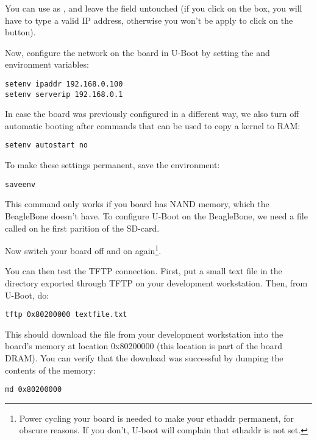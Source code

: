You can use  as , and leave the
 field untouched (if you click on the  box, you
will have to type a valid IP address, otherwise you won't be apply to
click on the  button).

Now, configure the network on the board in U-Boot by setting the 
and  environment variables:

\begin{verbatim}
setenv ipaddr 192.168.0.100
setenv serverip 192.168.0.1
\end{verbatim}

In case the board was previously configured in a different way, we
also turn off automatic booting after commands that can be used to
copy a kernel to RAM:

\begin{verbatim}
setenv autostart no
\end{verbatim}

To make these settings permanent, save the environment:

\begin{verbatim}
saveenv
\end{verbatim}

This command only works if you board has NAND memory, which the BeagleBone doesn't have.
To configure U-Boot on the BeagleBone, we need a file called  on he first parition of the SD-card.

Now switch your board off and on again\footnote{Power cycling your
  board is needed to make your ethaddr permanent, for obscure
  reasons. If you don't, U-boot will complain that ethaddr is not
  set.}.

You can then test the TFTP connection. First, put a small text file in
the directory exported through TFTP on your development
workstation. Then, from U-Boot, do:

\begin{verbatim}
tftp 0x80200000 textfile.txt
\end{verbatim}

This should download the file  from your development
workstation into the board's memory at location 0x80200000 (this
location is part of the board DRAM). You can verify that the download
was successful by dumping the contents of the memory:

\begin{verbatim}
md 0x80200000
\end{verbatim}

